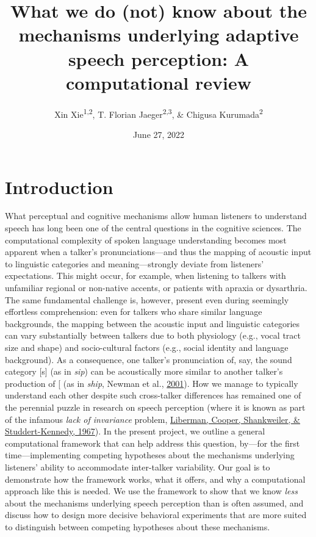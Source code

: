 \documentclass[
  11pt,
  man,floatsintext]{apa6}
\title{What we do (not) know about the mechanisms underlying adaptive speech perception: A computational review}
\author{Xin Xie\textsuperscript{1,2}, T. Florian Jaeger\textsuperscript{2,3}, \& Chigusa Kurumada\textsuperscript{2}}
\date{June 27, 2022}
\affiliation{\vspace{0.5cm}\textsuperscript{1} Language Science, University of California, Irvine\\\textsuperscript{2} Brain and Cognitive Sciences, University of Rochester\\\textsuperscript{3} Computer Science, University of Rochester}
\begin{document}
\maketitle

\hypertarget{introduction}{%
\section{Introduction}\label{introduction}}

What perceptual and cognitive mechanisms allow human listeners to understand speech has long been one of the central questions in the cognitive sciences. The computational complexity of spoken language understanding becomes most apparent when a talker's pronunciations---and thus the mapping of acoustic input to linguistic categories and meaning---strongly deviate from listeners' expectations. This might occur, for example, when listening to talkers with unfamiliar regional or non-native accents, or patients with apraxia or dysarthria. The same fundamental challenge is, however, present even during seemingly effortless comprehension: even for talkers who share similar language backgrounds, the mapping between the acoustic input and linguistic categories can vary substantially between talkers due to both physiology (e.g., vocal tract size and shape) and socio-cultural factors (e.g., social identity and language background). As a consequence, one talker's pronunciation of, say, the sound category {[}s{]} (as in \emph{sip}) can be acoustically more similar to another talker's production of {[}\ipatext{ʃ}{]} (as in \emph{ship}, Newman et al., \protect\hyperlink{ref-newman2001}{2001}). How we manage to typically understand each other despite such cross-talker differences has remained one of the perennial puzzle in research on speech perception (where it is known as part of the infamous \emph{lack of invariance} problem, \protect\hyperlink{ref-liberman1967}{Liberman, Cooper, Shankweiler, \& Studdert-Kennedy, 1967}). In the present project, we outline a general computational framework that can help address this question, by---for the first time---implementing competing hypotheses about the mechanisms underlying listeners' ability to accommodate inter-talker variability. Our goal is to demonstrate how the framework works, what it offers, and why a computational approach like this is needed. We use the framework to show that we know \emph{less} about the mechanisms underlying speech perception than is often assumed, and discuss how to design more decisive behavioral experiments that are more suited to distinguish between competing hypotheses about these mechanisms.
\end{document}
